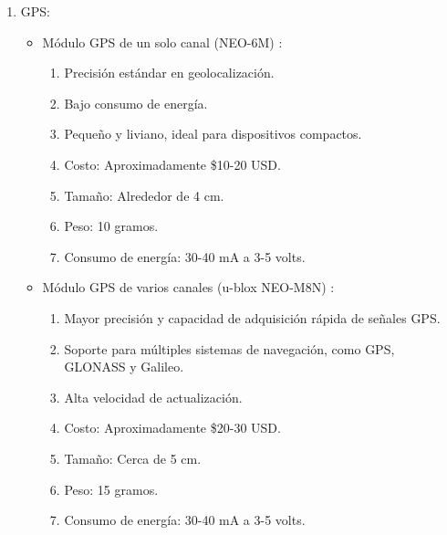 \begin{enumerate}
\item GPS:
\begin{itemize}
    \item Módulo GPS de un solo canal (NEO-6M) \cite{94}:
\begin{enumerate}
        \item Precisión estándar en geolocalización.
        \item Bajo consumo de energía.
        \item Pequeño y liviano, ideal para dispositivos compactos.
        \item Costo: Aproximadamente \$10-20 USD.
        \item Tamaño: Alrededor de 4 cm.
        \item Peso: 10 gramos.
        \item Consumo de energía: 30-40 mA a 3-5 volts.
\end{enumerate}
    \item Módulo GPS de varios canales (u-blox NEO-M8N) \cite{95}:
\begin{enumerate}
        \item Mayor precisión y capacidad de adquisición rápida de señales GPS.
        \item Soporte para múltiples sistemas de navegación, como GPS, GLONASS y Galileo.
        \item Alta velocidad de actualización.
        \item Costo: Aproximadamente \$20-30 USD.
        \item Tamaño: Cerca de 5 cm.
        \item Peso: 15 gramos.
        \item Consumo de energía: 30-40 mA a 3-5 volts.

\end{enumerate}
\end{itemize}


\end{enumerate}
